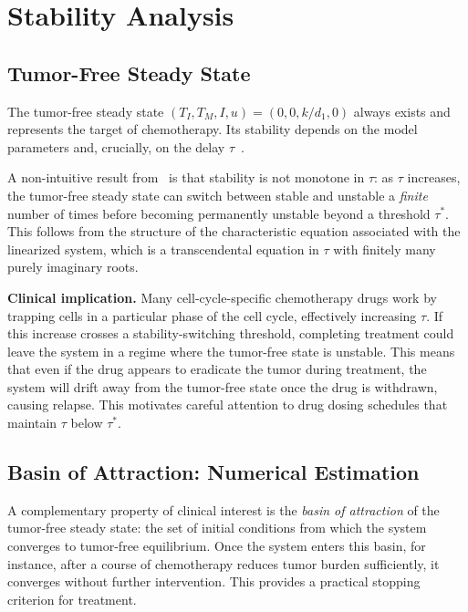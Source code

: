 \section{Stability Analysis}
\label{sec:analysis}

\subsection{Tumor-Free Steady State}

The tumor-free steady state $(T_I, T_M, I, u) = (0, 0, k/d_1, 0)$ always exists and represents the target of chemotherapy. Its stability depends on the model parameters and, crucially, on the delay $\tau$~\cite{villasana_delay_2003}.

A non-intuitive result from~\cite{villasana_delay_2003} is that stability is not monotone in $\tau$: as $\tau$ increases, the tumor-free steady state can switch between stable and unstable a \emph{finite} number of times before becoming permanently unstable beyond a threshold $\tau^*$. This follows from the structure of the characteristic equation associated with the linearized system, which is a transcendental equation in $\tau$ with finitely many purely imaginary roots.

\textbf{Clinical implication.} Many cell-cycle-specific chemotherapy drugs work by trapping cells in a particular phase of the cell cycle, effectively increasing $\tau$. If this increase crosses a stability-switching threshold, completing treatment could leave the system in a regime where the tumor-free state is unstable. This means that even if the drug appears to eradicate the tumor during treatment, the system will drift away from the tumor-free state once the drug is withdrawn, causing relapse. This motivates careful attention to drug dosing schedules that maintain $\tau$ below $\tau^*$.

\subsection{Basin of Attraction: Numerical Estimation}

A complementary property of clinical interest is the \emph{basin of attraction} of the tumor-free steady state: the set of initial conditions from which the system converges to tumor-free equilibrium. Once the system enters this basin, for instance, after a course of chemotherapy reduces tumor burden sufficiently, it converges without further intervention. This provides a practical stopping criterion for treatment.

